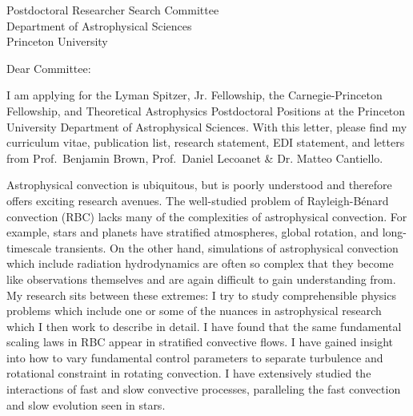 \documentclass[12pt]{letter}
\begin{document}
\begin{letter}{
               Postdoctoral Researcher Search Committee \\
               Department of Astrophysical Sciences \\
               Princeton University
           }

\opening{Dear Committee:}

    I am applying for the Lyman Spitzer, Jr. Fellowship, the Carnegie-Princeton Fellowship, and Theoretical Astrophysics Postdoctoral Positions at the Princeton University Department of Astrophysical Sciences.
    With this letter, please find my curriculum vitae, publication list, research statement, EDI statement, and letters from Prof.~Benjamin Brown, Prof.~Daniel Lecoanet \& Dr. Matteo Cantiello.

    Astrophysical convection is ubiquitous, but is poorly understood and therefore offers exciting research avenues.
    The well-studied problem of Rayleigh-B\'{e}nard convection (RBC) lacks many of the complexities of astrophysical convection.
    For example, stars and planets have stratified atmospheres, global rotation, and long-timescale transients.
    On the other hand, simulations of astrophysical convection which include radiation hydrodynamics are often so complex that they become like observations themselves and are again difficult to gain understanding from.
    My research sits between these extremes: I try to study comprehensible physics problems which include one or some of the nuances in astrophysical research which I then work to describe in detail.
    I have found that the same fundamental scaling laws in RBC appear in stratified convective flows.
    I have gained insight into how to vary fundamental control parameters to separate turbulence and rotational constraint in rotating convection.
    I have extensively studied the interactions of fast and slow convective processes, paralleling the fast convection and slow evolution seen in stars.


\end{letter}
\end{document}
